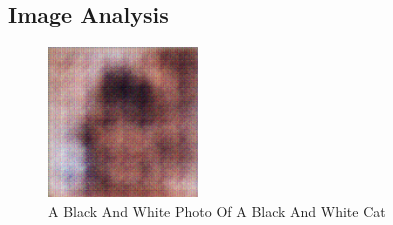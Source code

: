 \documentclass{article}%
\begin{document}
%
\subsection{Image Analysis}%
\label{subsec:ImageAnalysis}%


\begin{figure}[h!]%
\centering%
\includegraphics[width=150px]{500_fake_images/samples_5_201.png}%
\caption{A Black And White Photo Of A Black And White Cat}%
\end{figure}

%
\end{document}
